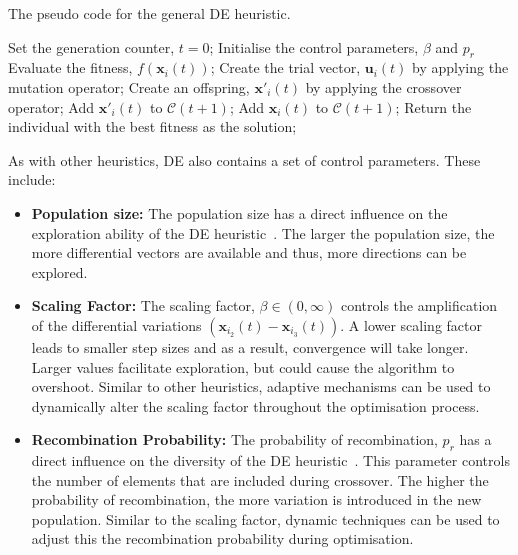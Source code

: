 \begin{algorithm}[H]
      \caption{The pseudo code for the general \acs{DE} heuristic.}
      \label{algo:heuristics:de:general_de}
      \begin{algorithmic}
            \State Set the generation counter, $t = 0$;
            \State Initialise the control parameters, $\beta$ and $p_{r}$
            \State Evaluate the fitness, $f(\boldsymbol{x}_{i}(t))$;
            \State Create the trial vector, $\boldsymbol{u}_{i}(t)$ by applying the mutation operator;
            \State Create an offspring, $\boldsymbol{x}'_{i}(t)$ by applying the crossover operator;
            \State Add $\boldsymbol{x}'_{i}(t)$ to $\mathcal{C}(t+1)$;
            \Else
            \State Add $\boldsymbol{x}_{i}(t)$ to $\mathcal{C}(t+1)$;
            \EndIf
            \EndFor
            \EndWhile
            \State Return the individual with the best fitness as the solution;
      \end{algorithmic}
\end{algorithm}

As with other heuristics, \acs{DE} also contains a set of control parameters. These include:

\begin{itemize}
      \item \textbf{Population size:} The population size has a direct influence on the exploration ability of the \acs{DE} heuristic~\cite{ref:engelbrecht:2007}. The larger the population size, the more differential vectors are available and thus, more directions can be explored.

      \item \textbf{Scaling Factor:} The scaling factor, $\beta \in (0, \infty)$ controls the amplification of the differential variations $(\boldsymbol{x}_{i_{2}}(t) - \boldsymbol{x}_{i_{3}}(t))$. A lower scaling factor leads to smaller step sizes and as a result, convergence will take longer. Larger values facilitate exploration, but could cause the algorithm to overshoot. Similar to other heuristics, adaptive mechanisms can be used to dynamically alter the scaling factor throughout the optimisation process.

      \item \textbf{Recombination Probability:} The probability of recombination, $p_{r}$ has a direct influence on the diversity of the \acs{DE} heuristic~\cite{ref:engelbrecht:2007}. This parameter controls the number of elements that are included during crossover. The higher the probability of recombination, the more variation is introduced in the new population. Similar to the scaling factor, dynamic techniques can be used to adjust this the recombination probability during optimisation.
\end{itemize}

